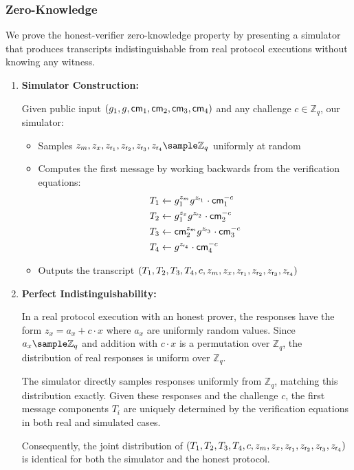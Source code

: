 \subsubsection*{Zero-Knowledge}
We prove the honest-verifier zero-knowledge property by presenting a simulator that produces transcripts indistinguishable from real protocol executions without knowing any witness.

\begin{enumerate}
    \item \textbf{Simulator Construction:}
    
    Given public input $(g_1, g, \mathsf{cm}_1, \mathsf{cm}_2, \mathsf{cm}_3, \mathsf{cm}_4)$ and any challenge $c \in \mathbb{Z}_q$, our simulator:
    
    \begin{itemize}
        \item Samples $z_m, z_x, z_{\usk_1}, z_{\usk_2}, z_{\usk_3}, z_{\usk_4} \sample \mathbb{Z}_q$ uniformly at random
        
        \item Computes the first message by working backwards from the verification equations:
        \begin{align}
            T_1 &\gets g_1^{z_m} g^{z_{\mathsf{r}_1}} \cdot \mathsf{cm}_1^{-c} \\
            T_2 &\gets g_1^{z_x} g^{z_{\mathsf{r}_2}} \cdot \mathsf{cm}_2^{-c} \\
            T_3 &\gets \mathsf{cm}_2^{z_m} g^{z_{\mathsf{r}_3}} \cdot \mathsf{cm}_3^{-c} \\
            T_4 &\gets g^{z_{\mathsf{r}_4}} \cdot \mathsf{cm}_4^{-c}
        \end{align}
        
        \item Outputs the transcript $(T_1, T_2, T_3, T_4, c, z_m, z_x, z_{\mathsf{r}_1}, z_{\mathsf{r}_2}, z_{\mathsf{r}_3}, z_{\mathsf{r}_4})$
    \end{itemize}
    
    \item \textbf{Perfect Indistinguishability:}
    
    In a real protocol execution with an honest prover, the responses have the form $z_x = a_x + c \cdot x$ where $a_x$ are uniformly random values. Since $a_x \sample \mathbb{Z}_q$ and addition with $c \cdot x$ is a permutation over $\mathbb{Z}_q$, the distribution of real responses is uniform over $\mathbb{Z}_q$.
    
    The simulator directly samples responses uniformly from $\mathbb{Z}_q$, matching this distribution exactly. Given these responses and the challenge $c$, the first message components $T_i$ are uniquely determined by the verification equations in both real and simulated cases.
    
    Consequently, the joint distribution of $(T_1, T_2, T_3, T_4, c, z_m, z_x, z_{\mathsf{r}_1}, z_{\mathsf{r}_2}, z_{\mathsf{r}_3}, z_{\mathsf{r}_4})$ is identical for both the simulator and the honest protocol.
\end{enumerate}

